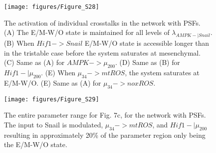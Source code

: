 \documentclass{article}
\begin{document}
\begin{figure}
\texttt{[image: figures/Figure\_S28]}
\caption{The activation of individual crosstalks in the network with PSFs. (A) The E/M-W/O state is maintained for all levels of $\lambda_{AMPK-|Snail}$. (B) When $Hif1-> Snail$ E/M-W/O state is accessible longer than in the tristable case before the system saturates at mesenchymal. (C) Same as (A) for $AMPK -> \mu_{200}$. (D) Same as (B) for $Hif1-| \mu_{200}$. (E) When $\mu_{34}->mtROS$, the system saturates at E/M-W/O. (E) Same as (A) for $\mu_{34}->noxROS$.}
\end{figure}

\begin{figure}
\texttt{[image: figures/Figure\_S29]}
\caption{The entire parameter range for Fig. 7c, for the network with PSFs. The input to Snail is modulated, $\mu_{34}->mtROS$, and $Hif1-|\mu_{200}$ resulting in approximately 20\% of the parameter region only being the E/M-W/O state. }
\end{figure}


\FloatBarrier
\newpage

\end{document}
